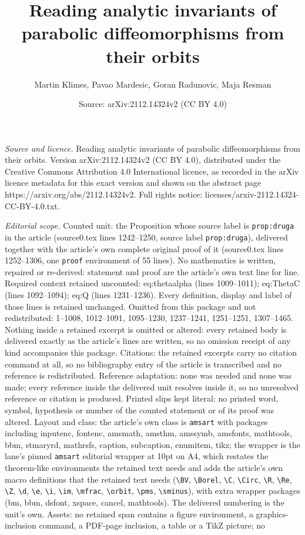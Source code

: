 \documentclass[10pt,a4paper]{amsart}
\title[Reading analytic invariants of parabolic diffeomorphisms fro]{Reading analytic invariants of parabolic diffeomorphisms from their orbits}
\author{Martin Klimes, Pavao Mardesic, Goran Radunovic, Maja Resman}
\date{Source: arXiv:2112.14324v2 (CC BY 4.0)}
\begin{document}
\maketitle

\noindent\emph{Source and licence.} Reading analytic invariants of parabolic diffeomorphisms from their orbits. Version arXiv:2112.14324v2 (CC BY 4.0), distributed under the Creative Commons Attribution 4.0 International licence, as recorded in the arXiv licence metadata for this exact version and shown on the abstract page https://arxiv.org/abs/2112.14324v2. Full rights notice: licenses/arxiv-2112.14324-CC-BY-4.0.txt.\par\smallskip

\noindent\textit{Editorial scope.} Counted unit: the Proposition whose source label is \texttt{prop:druga} in the article (source0.tex lines 1242--1250, source label \texttt{prop:druga}), delivered together with the article's own complete original proof of it (source0.tex lines 1252--1306, one \texttt{proof} environment of 55 lines). No mathematics is written, repaired or re-derived: statement and proof are the article's own text line for line. Required context retained uncounted: eq:thetaalpha (lines 1009--1011); eq:ThetaC (lines 1092--1094); eq:Q (lines 1231--1236). Every definition, display and label of those lines is retained unchanged. Omitted from this package and not redistributed: 1--1008, 1012--1091, 1095--1230, 1237--1241, 1251--1251, 1307--1465. Nothing inside a retained excerpt is omitted or altered: every retained body is delivered exactly as the article's lines are written, so no omission receipt of any kind accompanies this package. Citations: the retained excerpts carry no citation command at all, so no bibliography entry of the article is transcribed and no reference is redistributed. Reference adaptation: none was needed and none was made; every reference inside the delivered unit resolves inside it, so no unresolved reference or citation is produced. Printed slips kept literal: no printed word, symbol, hypothesis or number of the counted statement or of its proof was altered. Layout and class: the article's own class is \texttt{amsart} with packages including inputenc, fontenc, amsmath, amsthm, amssymb, amsfonts, mathtools, bbm, stmaryrd, mathrsfs, caption, subcaption, enumitem, tikz; the wrapper is the lane's pinned \texttt{amsart} editorial wrapper at 10pt on A4, which restates the theorem-like environments the retained text needs and adds the article's own macro definitions that the retained text needs (\texttt{\textbackslash BV}, \texttt{\textbackslash Borel}, \texttt{\textbackslash C}, \texttt{\textbackslash Circ}, \texttt{\textbackslash R}, \texttt{\textbackslash Re}, \texttt{\textbackslash Z}, \texttt{\textbackslash d}, \texttt{\textbackslash e}, \texttt{\textbackslash i}, \texttt{\textbackslash im}, \texttt{\textbackslash mfrac}, \texttt{\textbackslash orbit}, \texttt{\textbackslash pms}, \texttt{\textbackslash sminus}), with extra wrapper packages (bm, bbm, dsfont, xspace, cancel, mathtools). The delivered numbering is the unit's own. Assets: no retained span contains a figure environment, a graphics-inclusion command, a PDF-page inclusion, a table or a TikZ picture; no 
\end{document}
